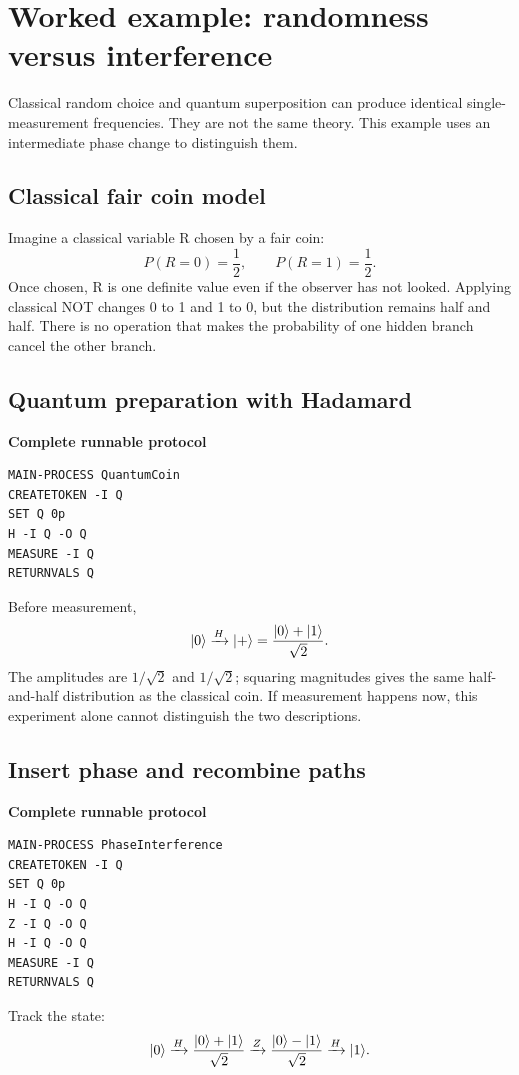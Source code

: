 \section{Worked example: randomness versus interference}

Classical random choice and quantum superposition can produce identical
single-measurement frequencies. They are not the same theory. This example
uses an intermediate phase change to distinguish them.

\subsection{Classical fair coin model}

Imagine a classical variable R chosen by a fair coin:
\[
P(R=0)=\frac12,\qquad P(R=1)=\frac12.
\]
Once chosen, R is one definite value even if the observer has not looked.
Applying classical NOT changes 0 to 1 and 1 to 0, but the distribution remains
half and half. There is no operation that makes the probability of one hidden
branch cancel the other branch.

\subsection{Quantum preparation with Hadamard}

\textbf{Complete runnable protocol}
\begin{lstlisting}
MAIN-PROCESS QuantumCoin
CREATETOKEN -I Q
SET Q 0p
H -I Q -O Q
MEASURE -I Q
RETURNVALS Q
\end{lstlisting}
Before measurement,
\[
\lvert 0\rangle\xrightarrow{H}
\lvert +\rangle=\frac{\lvert 0\rangle+\lvert 1\rangle}{\sqrt2}.
\]
The amplitudes are $1/\sqrt2$ and $1/\sqrt2$; squaring magnitudes gives the
same half-and-half distribution as the classical coin. If measurement happens
now, this experiment alone cannot distinguish the two descriptions.

\subsection{Insert phase and recombine paths}

\textbf{Complete runnable protocol}
\begin{lstlisting}
MAIN-PROCESS PhaseInterference
CREATETOKEN -I Q
SET Q 0p
H -I Q -O Q
Z -I Q -O Q
H -I Q -O Q
MEASURE -I Q
RETURNVALS Q
\end{lstlisting}
Track the state:
\[
\lvert 0\rangle
\xrightarrow{H}
\frac{\lvert 0\rangle+\lvert 1\rangle}{\sqrt2}
\xrightarrow{Z}
\frac{\lvert 0\rangle-\lvert 1\rangle}{\sqrt2}
\xrightarrow{H}
\lvert 1\rangle.
\]

